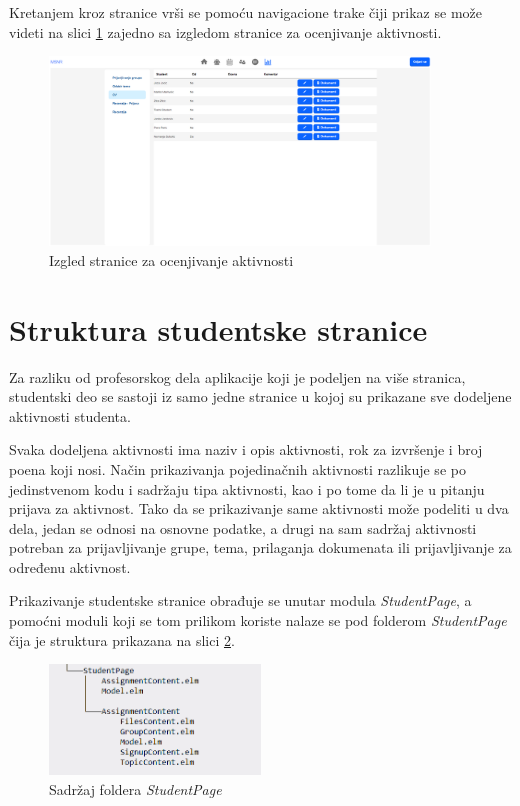 \documentclass[12pt,oneside]{memoir}
\begin{document}
Kretanjem kroz stranice vrši se pomoću navigacione trake čiji prikaz se može videti na
slici \ref{fig:professor-page} zajedno sa izgledom stranice za ocenjivanje aktivnosti.
\begin{figure}[!ht]
  \centering
  \includegraphics[width=0.9\textwidth]{professor-page.png}
  \caption{Izgled stranice za ocenjivanje aktivnosti}
  \label{fig:professor-page}
\end{figure}
\section{Struktura studentske stranice}
Za razliku od profesorskog dela aplikacije koji je podeljen na više stranica,
studentski deo se sastoji iz samo jedne stranice u kojoj su prikazane sve dodeljene
aktivnosti studenta. 

Svaka dodeljena aktivnosti ima naziv i opis aktivnosti, rok za izvršenje
i broj poena koji nosi. Način prikazivanja pojedinačnih aktivnosti razlikuje se po
jedinstvenom kodu i sadržaju tipa aktivnosti, kao i po tome da li je u pitanju prijava
za aktivnost. Tako da se prikazivanje same aktivnosti može podeliti u dva dela,
jedan se odnosi na osnovne podatke, a drugi na sam sadržaj aktivnosti potreban za prijavljivanje grupe,
tema, prilaganja dokumenata ili prijavljivanje za određenu aktivnost.

Prikazivanje studentske stranice obrađuje se unutar modula \emph{StudentPage},
a pomoćni moduli koji se tom prilikom koriste nalaze se pod folderom \emph{StudentPage} čija je
struktura prikazana na slici \ref{fig:student-dir}.
\begin{figure}[!ht]
  \centering
  \includegraphics[width=0.5\textwidth]{student-dir.png}
  \caption{Sadržaj foldera \emph{StudentPage}}
  \label{fig:student-dir}
\end{figure}
\end{document}
